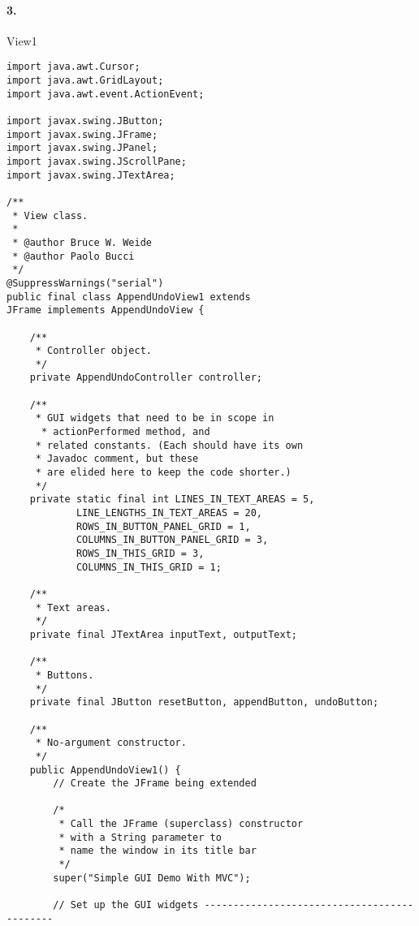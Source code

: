 \documentclass[10pt]{article}
\begin{document}
\paragraph{3. } View1

\begin{lstlisting}
import java.awt.Cursor;
import java.awt.GridLayout;
import java.awt.event.ActionEvent;

import javax.swing.JButton;
import javax.swing.JFrame;
import javax.swing.JPanel;
import javax.swing.JScrollPane;
import javax.swing.JTextArea;

/**
 * View class.
 *
 * @author Bruce W. Weide
 * @author Paolo Bucci
 */
@SuppressWarnings("serial")
public final class AppendUndoView1 extends 
JFrame implements AppendUndoView {

    /**
     * Controller object.
     */
    private AppendUndoController controller;

    /**
     * GUI widgets that need to be in scope in 
      * actionPerformed method, and
     * related constants. (Each should have its own 
     * Javadoc comment, but these
     * are elided here to keep the code shorter.)
     */
    private static final int LINES_IN_TEXT_AREAS = 5,
            LINE_LENGTHS_IN_TEXT_AREAS = 20, 
            ROWS_IN_BUTTON_PANEL_GRID = 1,
            COLUMNS_IN_BUTTON_PANEL_GRID = 3, 
            ROWS_IN_THIS_GRID = 3,
            COLUMNS_IN_THIS_GRID = 1;

    /**
     * Text areas.
     */
    private final JTextArea inputText, outputText;

    /**
     * Buttons.
     */
    private final JButton resetButton, appendButton, undoButton;

    /**
     * No-argument constructor.
     */
    public AppendUndoView1() {
        // Create the JFrame being extended

        /*
         * Call the JFrame (superclass) constructor 
         * with a String parameter to
         * name the window in its title bar
         */
        super("Simple GUI Demo With MVC");

        // Set up the GUI widgets --------------------------------------------


\end{lstlisting}
\end{document}
